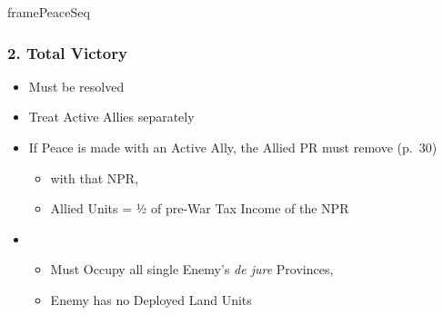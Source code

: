 \documentclass[10pt]{article}
\begin{document}
\begin{dynamiccontents*}{framePeaceSeq}
\begin{multicols}{2}
		\subsubsection*{2. Total Victory}
		\begin{itemize}
			\item Must be resolved
			\item Treat Active Allies separately
			\item If Peace is made with an Active Ally, the Allied PR must remove (p.~30)
			\begin{itemize}
				\item \alliance with that NPR, 
				\item Allied Units = ½ of pre-War Tax Income of the NPR
			\end{itemize}
			\item {}
			\begin{itemize}
				\item Must Occupy all single Enemy's \emph{de jure} Provinces, 
				\item Enemy has no Deployed Land Units
			\end{itemize}
		\end{itemize}


\end{multicols}
\end{dynamiccontents*}
\end{document}

